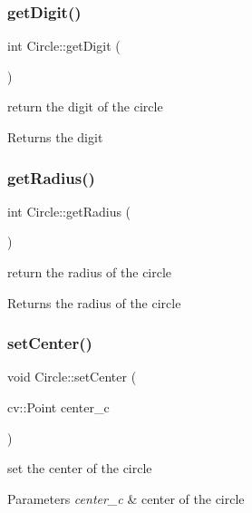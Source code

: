 \subsubsection{\texorpdfstring{get\+Digit()}{getDigit()}}
{\footnotesize\ttfamily int Circle\+::get\+Digit (\begin{DoxyParamCaption}{ }\end{DoxyParamCaption})}

return the digit of the circle \begin{DoxyReturn}{Returns}
the digit 
\end{DoxyReturn}
\mbox{\label{class_circle_adfc2e5e026f5d80215563cc42260a237}} 
\subsubsection{\texorpdfstring{get\+Radius()}{getRadius()}}
{\footnotesize\ttfamily int Circle\+::get\+Radius (\begin{DoxyParamCaption}{ }\end{DoxyParamCaption})}

return the radius of the circle \begin{DoxyReturn}{Returns}
the radius of the circle 
\end{DoxyReturn}
\mbox{\label{class_circle_a242599150a3623ea837fcb599214e33b}} 
\subsubsection{\texorpdfstring{set\+Center()}{setCenter()}}
{\footnotesize\ttfamily void Circle\+::set\+Center (\begin{DoxyParamCaption}\item[{cv\+::\+Point}]{center\+\_\+c }\end{DoxyParamCaption})}

set the center of the circle 
\begin{DoxyParams}{Parameters}
{\em center\+\_\+c} & center of the circle \\
\hline
\end{DoxyParams}
\mbox{\label{class_circle_a187d5c4d66124603abb89f57552b6c4c}} 
